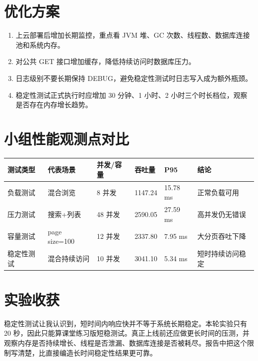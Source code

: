 \documentclass[UTF8,a4paper,12pt]{ctexart}
\begin{document}
\section{优化方案}
\begin{enumerate}
\item 上云部署后增加长期监控，重点看 JVM 堆、GC 次数、线程数、数据库连接池和系统内存。
\item 对公共 GET 接口增加缓存，降低持续访问时数据库压力。
\item 日志级别不要长期保持 DEBUG，避免稳定性测试时日志写入成为额外瓶颈。
\item 稳定性测试正式执行时应增加 30 分钟、1 小时、2 小时三个时长档位，观察是否存在内存增长趋势。
\end{enumerate}

\section{小组性能观测点对比}
\begin{longtable}{P{2.3cm}P{2.2cm}P{2.0cm}P{2.0cm}P{2.0cm}P{3.0cm}}
\toprule
测试类型 & 代表场景 & 并发/容量 & 吞吐量 & P95 & 结论\\
\midrule
负载测试 & 混合浏览 & 8 并发 & 1147.24 & 15.78 ms & 正常负载可用\\
压力测试 & 搜索+列表 & 48 并发 & 2590.05 & 27.59 ms & 高并发仍无错误\\
容量测试 & page size=100 & 12 并发 & 2337.80 & 7.95 ms & 大分页吞吐下降\\
稳定性测试 & 混合持续访问 & 10 并发 & 3041.10 & 5.34 ms & 短时持续访问稳定\\
\bottomrule
\end{longtable}

\section{实验收获}
稳定性测试让我认识到，短时间内响应快并不等于系统长期稳定。本轮实验只有 20 秒，因此只能算课堂练习版短稳测试。真正上线前还应做更长时间的压测，并观察内存是否持续增长、线程是否泄漏、数据库连接是否被耗尽。报告中把这个限制写清楚，比直接编造长时间稳定性结果更可靠。
\end{document}
